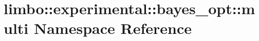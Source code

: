 \hypertarget{namespacelimbo_1_1experimental_1_1bayes__opt_1_1multi}{}\section{limbo\+:\+:experimental\+:\+:bayes\+\_\+opt\+:\+:multi Namespace Reference}
\label{namespacelimbo_1_1experimental_1_1bayes__opt_1_1multi}
